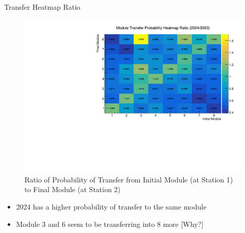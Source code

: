 \begin{frame}{Transfer Heatmap Ratio }
    \begin{figure}
        \includegraphics[width=0.86\linewidth]{./ModuleLevelPlots/st0_module_number vs st1_module_number_prob_ratio.pdf}
        \caption{Ratio of Probability of Transfer from Initial Module (at Station 1) to Final Module (at Station 2) }
    \end{figure}
    \begin{itemize}
        \small
        \item 2024 has a higher probability of transfer to the same module
        \item Module 3 and 6 seem to be transferring into 8 more [Why?]
    \end{itemize}

\end{frame}




